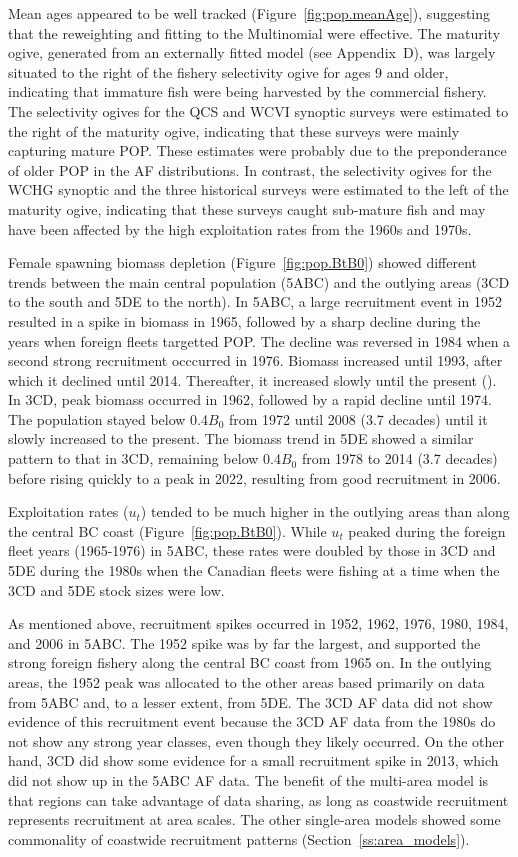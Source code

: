 \documentclass[11pt]{book}
\newcommand{\AppBio}{Appendix~D}
\begin{document}
Mean ages appeared to be well tracked (Figure~\ref{fig:pop.meanAge}), suggesting that the \citet{Francis:2011} reweighting and fitting to the Multinomial were effective.
The maturity ogive, generated from an externally fitted model (see \AppBio), was largely situated to the right of the fishery selectivity ogive for ages 9 and older, indicating that immature fish were being harvested by the commercial fishery.
The selectivity ogives for the QCS and WCVI synoptic surveys were estimated to the right of the maturity ogive, indicating that these surveys were mainly capturing mature POP.
These estimates were probably due to the preponderance of older POP in the AF distributions.
In contrast, the selectivity ogives for the WCHG synoptic and the three historical surveys were estimated to the left of the maturity ogive, indicating that these surveys caught sub-mature fish and may have been affected by the high exploitation rates from the 1960s and 1970s.

Female spawning biomass depletion (Figure~\ref{fig:pop.BtB0}) showed different trends between the main central population (5ABC) and the outlying areas (3CD to the south and 5DE to the north).
In 5ABC, a large recruitment event in 1952 resulted in a spike in biomass in 1965, followed by a sharp decline during the years when foreign fleets targetted POP.
The decline was reversed in 1984 when a second strong recruitment occcurred in 1976. 
Biomass increased until 1993, after which it declined until 2014. 
Thereafter, it increased slowly until the present (\currYear).
In 3CD, peak biomass occurred in 1962, followed by a rapid decline until 1974.
The population stayed below 0.4$B_0$ from 1972 until 2008 (3.7 decades) until it slowly increased to the present.
The biomass trend in 5DE showed a similar pattern to that in 3CD, remaining below 0.4$B_0$ from 1978 to 2014 (3.7 decades) before rising quickly to a peak in 2022, resulting from good recruitment in 2006.

Exploitation rates ($u_t$) tended to be much higher in the outlying areas than along the central BC coast (Figure~\ref{fig:pop.BtB0}).
While $u_t$ peaked during the foreign fleet years (1965-1976) in 5ABC, these rates were doubled by those in 3CD and 5DE during the 1980s when the Canadian fleets were fishing at a time when the 3CD and 5DE stock sizes were low.

As mentioned above, recruitment spikes occurred in 1952, 1962, 1976, 1980, 1984, and 2006 in 5ABC.
The 1952 spike was by far the largest, and supported the strong foreign fishery along the central BC coast from 1965 on.
In the outlying areas, the 1952 peak was allocated to the other areas based primarily on data from 5ABC and, to a lesser extent, from 5DE.
The 3CD AF data did not show evidence of this recruitment event because the 3CD AF data from the 1980s do not show any strong year classes, even though they likely occurred. 
On the other hand, 3CD did show some evidence for a small recruitment spike in 2013, which did not show up in the 5ABC AF data.
The benefit of the multi-area model is that regions can take advantage of data sharing, as long as coastwide recruitment represents recruitment at area scales.
The other single-area models showed some commonality of coastwide recruitment patterns (Section~\ref{ss:area_models}).
\end{document}
